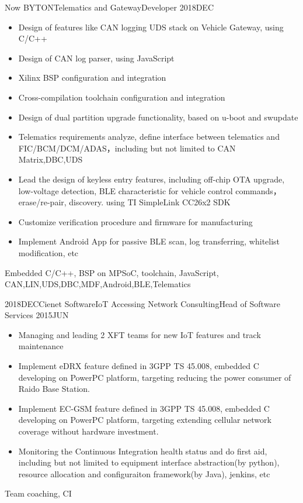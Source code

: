 %
%


 
\begin{experiences}
	
	\experience
	{Now} {BYTON}{Telematics and Gateway}{Developer}
	{2018DEC}    {
		\begin{itemize}
			\item Design of features like CAN logging  UDS stack on Vehicle Gateway, using C/C++
			\item Design of CAN log parser, using JavaScript
			\item Xilinx BSP configuration and integration
			\item Cross-compilation toolchain configuration and integration
			\item Design of dual partition upgrade functionality, based on u-boot and swupdate
			\item Telematics requirements analyze, define interface between telematics and FIC/BCM/DCM/ADAS，including but not limited to CAN Matrix,DBC,UDS
			\item Lead the design of keyless entry features, including off-chip OTA upgrade, low-voltage detection, BLE characteristic for vehicle control commands，erase/re-pair, discovery. using TI SimpleLink CC26x2 SDK
			\item Customize verification procedure and firmware for manufacturing
			\item Implement Android App for passive BLE scan, log transferring, whitelist modification, etc
		\end{itemize}
	}
	{Embedded C/C++, BSP on MPSoC, toolchain, JavaScript, CAN,LIN,UDS,DBC,MDF,Android,BLE,Telematics}
	
	\emptySeparator	
	\experience
	{2018DEC}{Cienet Software}{IoT Accessing Network Consulting}{Head of Software Services}
	{2015JUN} {
		\begin{itemize}
            \item Managing and leading 2 XFT teams for new IoT features and track maintenance
			\item Implement eDRX feature defined in 3GPP TS 45.008, embedded C developing on PowerPC platform, targeting reducing the power consumer of Raido Base Station.
			\item Implement EC-GSM feature defined in 3GPP TS 45.008, embedded C developing on PowerPC platform, targeting extending cellular network coverage without hardware investment.
			\item Monitoring the Continuous Integration health status and do first aid, including but not limited to equipment interface abstraction(by python), resource allocation and configuraiton framework(by Java), jenkins, etc
		\end{itemize}
	}
	{Team coaching, CI}
		

\end{experiences}

